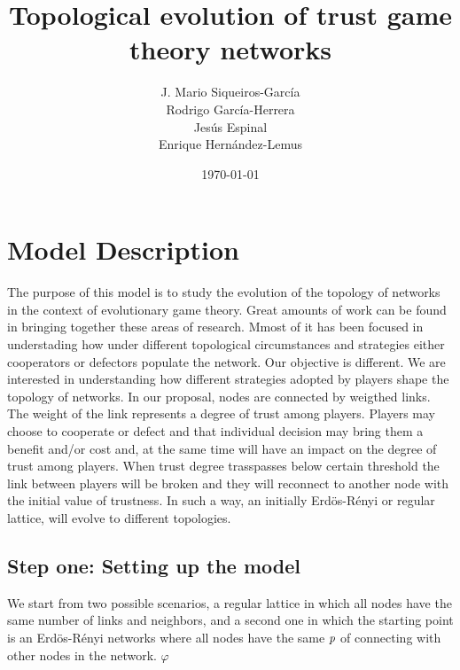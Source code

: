 \documentclass[11pt]{article}
\author{J. Mario Siqueiros-Garc\'ia\\ Rodrigo Garc\'ia-Herrera\\ Jes\'us Espinal\\ Enrique Hern\'andez-Lemus}
\title{Topological evolution of trust game theory networks}
\date{\today}
\begin{document}
\maketitle

\section{Model Description}

The purpose of this model is to study the evolution of the topology of
networks in the context of evolutionary game theory.
Great amounts of work can be found in bringing together these areas of
research. Mmost of it has been focused in understading how under different
topological circumstances and strategies either cooperators or
defectors populate the network. Our objective is different. We are
interested in understanding how different strategies adopted by
players shape the topology of networks. In our proposal,  nodes are
connected by weigthed links. The weight of the link represents a
degree of trust among players. Players may choose to cooperate or
defect and that individual decision may bring them a benefit and/or
cost and, at the same time will have an impact on the degree of trust
among players. When trust degree trasspasses below certain threshold
the link between players will be broken and they will reconnect to
another node with the initial value of trustness. In such a way, an
initially Erd\"{o}s-R\'enyi or regular lattice, will evolve to different topologies.



\subsection{Step one: Setting up the model}

We start from two possible scenarios, a regular lattice in which all nodes have the
same number of links and neighbors, and a second one in which the
starting point is an Erd\"{o}s-R\'enyi networks where all nodes have the
same $\emph{p}$ of connecting with other nodes in the network. $\varphi$
\end{document}
